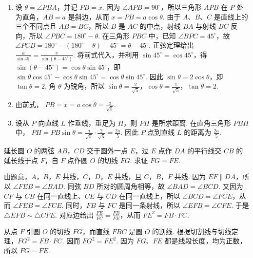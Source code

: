\documentclass[UTF8,a4paper,oneside,11pt]{ctexbook}
\begin{document}
\begin{solution}
\begin{enumerate}
\item 设 \(\theta=\angle PBA\)，并记 \(PB=x\). 因为 \(\angle APB=90^\circ\)，所以三角形 \(APB\) 在 \(P\) 处为直角，\(AB=a\) 是斜边，从而 \(x=PB=a\cos\theta\).
由于 \(A\)、\(B\)、\(C\) 是直线上的三个不同点且 \(AB=BC\)，所以 \(B\) 是 \(AC\) 的中点，射线 \(BA\) 与射线 \(BC\) 反向，所以
\(\angle PBC=180^\circ-\theta\). 在三角形 \(PBC\) 中，已知 \(\angle BPC=45^\circ\)，故 \(\angle PCB=180^\circ-\left(180^\circ-\theta\right)-45^\circ=\theta-45^\circ\). 正弦定理给出 \(\frac{a}{\sin45^\circ}=\frac{x}{\sin\left(\theta-45^\circ\right)}\). 将前式代入，并利用 \(\sin45^\circ=\cos45^\circ\)，得 \(\sin\left(\theta-45^\circ\right)=\cos\theta\sin45^\circ\)，即 \(\sin\theta\cos45^\circ-\cos\theta\sin45^\circ=\cos\theta\sin45^\circ\). 因此 \(\sin\theta=2\cos\theta\)，即 \(\tan\theta=2\). 角 \(\theta\) 为锐角，所以 \(\sin\theta=\frac{2}{\sqrt5}\)，\(\cos\theta=\frac{1}{\sqrt5}\)，\(\tan\theta=2\).

\item 由前式，
\(PB=x=a\cos\theta=\frac{a}{\sqrt5}\).
\item 设从 \(P\) 向直线 \(L\) 作垂线，垂足为 \(H\)，则 \(PH\) 是所求距离. 在直角三角形 \(PBH\) 中，
\(PH=PB\sin\theta=\frac{a}{\sqrt5}\cdot\frac{2}{\sqrt5}=\frac{2a}{5}\).
因此 \(P\) 点到直线 \(L\) 的距离为 \(\frac{2a}{5}\).
\end{enumerate}
\end{solution}

\begin{problem}
延长圆 \(O\) 的两弦 \(AB\)，\(CD\) 交于圆外一点 \(E\)，过 \(E\) 点作 \(DA\) 的平行线交 \(CB\) 的延长线于点 \(F\)，自 \(F\) 点作圆 \(O\) 的切线 \(FG\). 求证 \(FG=FE\).

\end{problem}

\begin{solution}
由题意，\(A\)，\(B\)，\(E\) 共线，\(C\)，\(D\)，\(E\) 共线，且 \(C\)，\(B\)，\(F\) 共线. 因为 \(EF\parallel DA\)，所以 \(\angle FEB=\angle BAD\). 同弦 \(BD\) 所对的圆周角相等，故 \(\angle BAD=\angle BCD\). 又因为 \(CF\) 与 \(CB\) 在同一直线上、\(CE\) 与 \(CD\) 在同一直线上，所以 \(\angle BCD=\angle FCE\)，从而 \(\angle FEB=\angle FCE\). 同时，\(FB\) 与 \(FC\) 是同一条射线，所以 \(\angle EFB=\angle CFE\). 于是 \(\triangle EFB\sim\triangle CFE\). 对应边给出 \(\frac{FE}{FC}=\frac{FB}{FE}\)，从而 \(FE^2=FB\cdot FC\).

从点 \(F\) 引圆 \(O\) 的切线 \(FG\)，而直线 \(FBC\) 是圆 \(O\) 的割线. 根据切割线与切线定理，\(FG^2=FB\cdot FC\). 因而 \(FG^2=FE^2\). 因为 \(FG\)、\(FE\) 都是线段长度，均为正数，所以 \(FG=FE\).
\end{solution}

\end{document}
